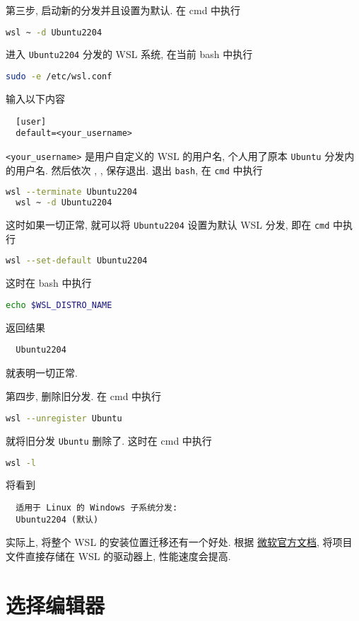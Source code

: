 \documentclass[fontset=founder]{ctexrep}
\begin{document}
第三步,
启动新的分发并且设置为默认.
在 \textsf{cmd} 中执行
\begin{lstlisting}[language=bash]
  wsl ~ -d Ubuntu2204
\end{lstlisting}
进入 \texttt{Ubuntu2204} 分发的 WSL 系统,
在当前 \textsf{bash} 中执行
\begin{lstlisting}[language=bash]
  sudo -e /etc/wsl.conf
\end{lstlisting}
输入以下内容
\begin{lstlisting}
  [user]
  default=<your_username>
\end{lstlisting}
\texttt{<your\_username>} 是用户自定义的 WSL 的用户名,
个人用了原本 \texttt{Ubuntu} 分发内的用户名.
然后依次 , , \keys{\enter} 保存退出.
退出 \texttt{bash},
在 \texttt{cmd} 中执行
\begin{lstlisting}[language=bash]
  wsl --terminate Ubuntu2204
  wsl ~ -d Ubuntu2204
\end{lstlisting}
这时如果一切正常,
就可以将 \texttt{Ubuntu2204} 设置为默认 WSL 分发,
即在 \texttt{cmd} 中执行
\begin{lstlisting}[language=bash]
  wsl --set-default Ubuntu2204
\end{lstlisting}
这时在 \textsf{bash} 中执行
\begin{lstlisting}[language=bash]
  echo $WSL_DISTRO_NAME
\end{lstlisting}
返回结果
\begin{lstlisting}
  Ubuntu2204
\end{lstlisting}
就表明一切正常.

第四步,
删除旧分发.
在 \textsf{cmd} 中执行
\begin{lstlisting}[language=bash]
  wsl --unregister Ubuntu
\end{lstlisting}
就将旧分发 \texttt{Ubuntu} 删除了.
这时在 \textsf{cmd} 中执行
\begin{lstlisting}[language=bash]
  wsl -l
\end{lstlisting}
将看到
\begin{lstlisting}
  适用于 Linux 的 Windows 子系统分发:
  Ubuntu2204 (默认)
\end{lstlisting}

实际上,
将整个 WSL 的安装位置迁移还有一个好处.
根据%
\href{https://learn.microsoft.com/zh-cn/windows/wsl/filesystems#file-storage-and-performance-across-file-systems}{微软官方文档},
将项目文件直接存储在 WSL 的驱动器上,
性能速度会提高.

\section{选择编辑器}\label{sec:editor}
\end{document}
